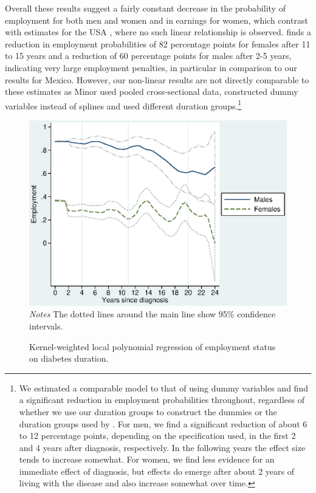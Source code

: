 Overall these results suggest a fairly constant decrease in the probability of employment for both men and women and in earnings for women, which contrast with estimates for the USA \parencite{Minor2013}, where no such linear relationship is observed.  \textcite{Minor2013} finds a reduction in employment probabilities of 82 percentage points for females after 11 to 15 years and a reduction of 60 percentage points for males after 2-5 years, indicating very large employment penalties, in particular in comparison to our results for Mexico. However, our non-linear results are not directly comparable to these estimates as Minor used pooled cross-sectional data, constructed dummy variables instead of splines and used different duration groups.\footnote{We estimated a comparable model to that of \textcite{Minor2013} using dummy variables and find a significant reduction in employment probabilities throughout, regardless of whether we use our duration groups to construct the dummies or the duration groups used by \textcite{Minor2013}. For men, we find a significant reduction of about 6 to 12 percentage points, depending on the specification used, in the first 2 and 4 years after diagnosis, respectively. In the following years the effect size tends to increase somewhat. For women, we find less evidence for an immediate effect of diagnosis, but effects do emerge after about 2 years of living with the disease and also increase somewhat over time.}



  
\newpage
\begin{figure}[h!]
\caption{\label{fig:Kernel-weighted-local-polynomial_empl}Kernel-weighted local
polynomial regression of employment status on diabetes duration.}%
\begin{center}
\includegraphics[width=\linewidth]{Chapter4/Figures/lpoly_works_diabetesduration.eps}\\
\footnotesize{\textit{Notes} The dotted lines around the main line show 95\% confidence intervals.}
\end{center}
\end{figure}

